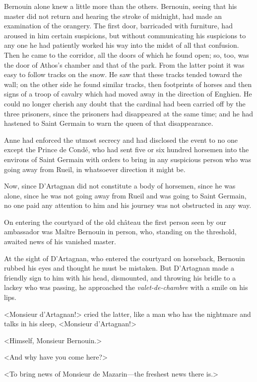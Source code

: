 Bernouin alone knew a little more than the others. Bernouin, seeing that his master did not return and hearing the stroke of midnight, had made an examination of the orangery. The first door, barricaded with furniture, had aroused in him certain suspicions, but without communicating his suspicions to any one he had patiently worked his way into the midst of all that confusion. Then he came to the corridor, all the doors of which he found open; so, too, was the door of Athos's chamber and that of the park. From the latter point it was easy to follow tracks on the snow. He saw that these tracks tended toward the wall; on the other side he found similar tracks, then footprints of horses and then signs of a troop of cavalry which had moved away in the direction of Enghien. He could no longer cherish any doubt that the cardinal had been carried off by the three prisoners, since the prisoners had disappeared at the same time; and he had hastened to Saint Germain to warn the queen of that disappearance.

Anne had enforced the utmost secrecy and had disclosed the event to no one except the Prince de Condé, who had sent five or six hundred horsemen into the environs of Saint Germain with orders to bring in any suspicious person who was going away from Rueil, in whatsoever direction it might be.

Now, since D'Artagnan did not constitute a body of horsemen, since he was alone, since he was not going away from Rueil and was going to Saint Germain, no one paid any attention to him and his journey was not obstructed in any way.

On entering the courtyard of the old château the first person seen by our ambassador was Maître Bernouin in person, who, standing on the threshold, awaited news of his vanished master.

At the sight of D'Artagnan, who entered the courtyard on horseback, Bernouin rubbed his eyes and thought he must be mistaken. But D'Artagnan made a friendly sign to him with his head, dismounted, and throwing his bridle to a lackey who was passing, he approached the \textit{valet-de-chambre} with a smile on his lips.

<Monsieur d'Artagnan!> cried the latter, like a man who has the nightmare and talks in his sleep, <Monsieur d'Artagnan!>

<Himself, Monsieur Bernouin.>

<And why have you come here?>

<To bring news of Monsieur de Mazarin—the freshest news there is.>

